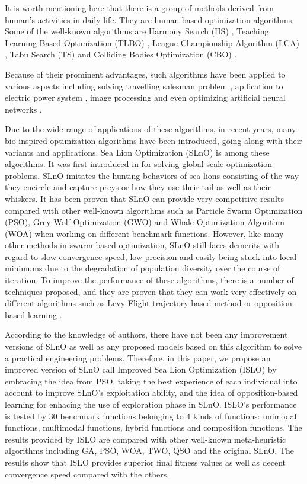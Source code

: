 \documentclass[a4paper,13pt,2p]{report}
\begin{document}
	It is worth mentioning here that there is a group of methods derived from human's activities in daily life. They are human-based optimization algorithms. Some of the well-known algorithms are Harmony Search (HS) \cite{geem2001new}, Teaching Learning Based Optimization (TLBO) \cite{rao2011teaching}, League Championship Algorithm (LCA) \cite{kashan2014league}, Tabu Search (TS) \cite{de1989tabu} and Colliding Bodies Optimization (CBO) \cite{kaveh2014colliding}.
	
	Because of their prominent advantages, such algorithms have been applied to various aspects including solving travelling salesman problem \cite{wang2003particle}, apllication to electric power system \cite{yuan2004survey}, image processing \cite{karmakar2002generic} \cite{hore2011edge} and even optimizing artificial neural networks \cite{bhesdadiya2016training} \cite{matias2014learning}. 
	
	Due to the wide range of applications of these algorithms, in recent years, many bio-inspired optimization algorithms have been introduced, going along with their variants and applications. Sea Lion Optimization (SLnO) is among these algorithms. It was first introduced in \cite{masadeh2019sea} for solving global-scale optimization problems. SLnO imitates the hunting behaviors of sea lions consisting of the way they encircle and capture preys or how they use their tail as well as their whiskers. It has been proven that SLnO can provide very competitive results compared with other well-known algorithms such as Particle Swarm Optimization (PSO), Grey Wolf Optimization (GWO) and Whale Optimization Algorithm (WOA) when working on different benchmark functions. However, like many other methods in swarm-based optimization, SLnO still faces demerits with regard to slow convergence speed, low precision and easily being stuck into local minimums due to the degradation of population diversity over the course of iteration. To improve the performance of these algorithms, there is a number of techniques proposed, and they are proven that they can work very effectively on different algorithms such as Levy-Flight trajectory-based method \cite{chawla2018levy} or opposition-based learning \cite{wang2011enhanced} \cite{omran2010improving} \cite{wang2016opposition}. 
	
	According to the knowledge of authors, there have not been any improvement versions of SLnO as well as any proposed models based on this algorithm to solve a practical engineering problems. Therefore, in this paper, we propose an improved version of SLnO call Improved Sea Lion Optimization (ISLO) by embracing the idea from PSO, taking the best experience of each individual into account to improve SLnO's exploitation ability, and the idea of opposition-based learning for enhacing the use of exploration phase in SLnO. ISLO's performance is tested by 30 benchmark functions belonging to 4 kinds of functions: unimodal functions, multimodal functions, hybrid functions and composition functions. The results provided by ISLO are compared with other well-known meta-heuristic algorithms including GA, PSO, WOA, TWO, QSO and the original SLnO. The results show that ISLO provides superior final fitness values as well as decent convergence speed compared with the others.
	
\end{document}
